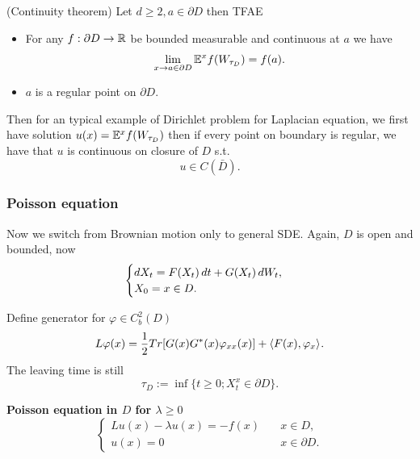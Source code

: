 \begin{thm}{(Continuity theorem)}
Let $d\geq 2, a\in\partial D$ then TFAE
\begin{itemize}
    \item For any $f: \partial D \rightarrow \mathbb{R}$ be bounded measurable and continuous at $a$ we have 
    \begin{equation*}
        \lim\limits_{x\rightarrow a\in \partial D} \mathbb{E}^x f(W_{\tau_D}) = f(a).
    \end{equation*}
    \item $a$ is a regular point on $\partial D$.
\end{itemize}
\end{thm}
Then for an typical example of Dirichlet problem for Laplacian equation, we first have solution $u(x) = \mathbb{E}^x f(W_{\tau_D})$ then if every point on boundary is regular, we have that $u$ is continuous on closure of $D$ s.t. \begin{equation*}
    u\in C(\bar{D}).
\end{equation*}

\subsubsection{Poisson equation}
Now we switch from Brownian motion only to general SDE. Again, $D$ is open and bounded, now 
\begin{equation*}
\begin{cases}
    \mathop{}\!d X_t = F(X_t) \mathop{}\!d t + G(X_t) \mathop{}\!d W_t, \\
    X_0 = x \in D.
\end{cases}
\end{equation*}

Define generator for $\varphi \in C_b^2(D)$
\begin{equation*}
    L\varphi(x) = \frac{1}{2} Tr[G(x)G^*(x) \varphi_{xx}(x)] + \langle{F(x), \varphi_x} \rangle_{}.
\end{equation*}
The leaving time is still 
\begin{equation*}
    \tau_D := \inf\{t\geq 0; X_t^x \in \partial D \}.
\end{equation*}

\begin{dfn}{\textbf{Poisson equation in $D$ for $\lambda \geq 0$}}
\begin{equation*}
    \begin{cases}
        L u(x) - \lambda u(x) = -f(x) \quad & x\in D, \\
        u(x) = 0 \quad & x\in \partial D.
    \end{cases}
\end{equation*}
\end{dfn}

